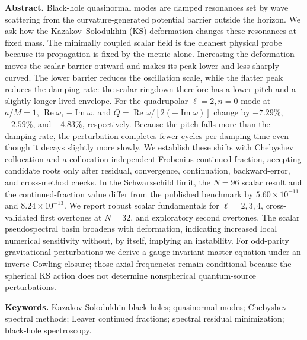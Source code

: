 \documentclass[12pt,a4paper]{article}
\begin{document}
\begin{center}
\begin{minipage}{0.92\textwidth}
\small
\noindent\textbf{Abstract.}
\color{blue}
Black-hole quasinormal modes are damped resonances set by wave scattering from
the curvature-generated potential barrier outside the horizon.  We ask how the
Kazakov--Solodukhin (KS) deformation changes these resonances at fixed mass.
The minimally coupled scalar field is the cleanest physical probe because its
propagation is fixed by the metric alone.  Increasing the deformation moves
the scalar barrier outward and makes its peak lower and less sharply curved.
The lower barrier reduces the oscillation scale, while the flatter peak
reduces the damping rate: the scalar ringdown therefore has a lower pitch and
a slightly longer-lived envelope.  For the quadrupolar \(\ell=2,n=0\) mode at
\(a/M=1\), \(\operatorname{Re}\omega\), \(-\operatorname{Im}\omega\), and
\(Q=\operatorname{Re}\omega/[2(-\operatorname{Im}\omega)]\) change by
\(-7.29\%\), \(-2.59\%\), and \(-4.83\%\), respectively.  Because the pitch
falls more than the damping rate, the perturbation completes fewer cycles per
damping time even though it decays slightly more slowly.  We establish these
shifts with Chebyshev collocation and a collocation-independent Frobenius
continued fraction, accepting candidate roots only after residual,
convergence, continuation, backward-error, and cross-method checks.  In the
Schwarzschild limit, the \(N=96\) scalar result and the continued-fraction
value differ from the published benchmark by \(5.60\times10^{-11}\) and
\(8.24\times10^{-13}\).  We report robust scalar fundamentals for
\(\ell=2,3,4\), cross-validated first overtones at \(N=32\), and exploratory
second overtones.  The scalar pseudospectral basin broadens with deformation,
indicating increased local numerical sensitivity without, by itself, implying
an instability.
For odd-parity gravitational perturbations we derive a gauge-invariant master
equation under an inverse-Cowling closure; those axial frequencies remain
conditional because the spherical KS action does not determine nonspherical
quantum-source perturbations.
\color{black}

\vspace{0.65em}
\noindent\textbf{Keywords.}
Kazakov-Solodukhin black holes; quasinormal modes; Chebyshev spectral methods; Leaver continued fractions; spectral residual minimization; black-hole spectroscopy.
\end{minipage}
\end{center}
\vspace{1.0em}
\begingroup
\renewcommand{\thefootnote}{*}
\endgroup
\thispagestyle{empty}
\end{document}
